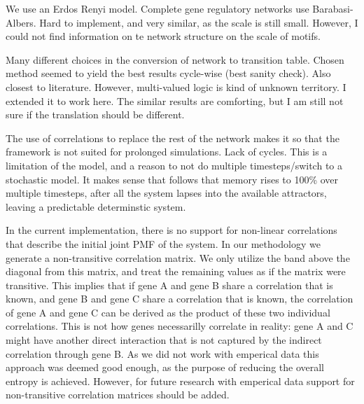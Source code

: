 \documentclass[../main.tex]{subfiles}
\begin{document}
We use an Erdos Renyi model.
Complete gene regulatory networks use Barabasi-Albers.
Hard to implement, and very similar, as the scale is still small.
However, I could not find information on te network structure on the scale of motifs.

Many different choices in the conversion of network to transition table.
Chosen method seemed to yield the best results cycle-wise (best sanity check).
Also closest to literature.
However, multi-valued logic is kind of unknown territory.
I extended it to work here.
The similar results are comforting, but I am still not sure if the translation should be different.

The use of correlations to replace the rest of the network makes it so that the framework is not suited for prolonged simulations.
Lack of cycles.
This is a limitation of the model, and a reason to not do multiple timesteps/switch to a stochastic model.
It makes sense that follows that memory rises to 100\% over multiple timesteps, after all the system lapses into the available attractors, leaving a predictable determinstic system.

In the current implementation, there is no support for non-linear correlations that describe the initial joint PMF of the system.
In our methodology we generate a non-transitive correlation matrix.
We only utilize the band above the diagonal from this matrix, and treat the remaining values as if the matrix were transitive.
This implies that if gene A and gene B share a correlation that is known, and gene B and gene C share a correlation that is known, the correlation of gene A and gene C can be derived as the product of these two individual correlations.
This is not how genes necessarilly correlate in reality: gene A and C might have another direct interaction that is not captured by the indirect correlation through gene B.
As we did not work with emperical data this approach was deemed good enough, as the purpose of reducing the overall entropy is achieved.
However, for future research with emperical data support for non-transitive correlation matrices should be added.
\end{document}
